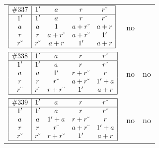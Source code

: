 \documentclass[12pt]{article}
\theoremstyle{definition}
\newcommand{\join}{\mathbin{+}}%
\newcommand{\con}[1]{#1\breve{\ }}
\newcommand{\id}{{1'}}%
\renewcommand{\top}{1}%
\begin{document}
\begin{center}
\begin{longtable}{l|c|c}
$
\begin{array}{|c|cccc|} \hline
\#337 & \id & a & r & \con{r} \\ \hline
\id & \id & a & r & \con{r} \\
a & a & \top & a \join \con{r} & a \join r \\
r & r & a \join \con{r} & a \join \con{r} & \id \\
\con{r} & \con{r} & a \join r & \id & a \join r \\ \hline
\end{array}
$
 & no  
 & \adjustbox{valign=c, max height=1.6cm}{$
\left[ \begin{array}{cccccc}
\id & a & r & \con{r} & a & a \\ 
a & \id & a & a & a & r \\ 
\con{r} & a & \id & r & a & a \\ 
r & a & \con{r} & \id & a & a \\ 
a & a & a & a & \id & \con{r} \\ 
a & \con{r} & a & a & r & \id
\end{array}\right]
$}
     \\[15mm]

$
\begin{array}{|c|cccc|} \hline
\#338 & \id & a & r & \con{r} \\ \hline
\id & \id & a & r & \con{r} \\
a & a & \id & r \join \con{r} & r \\
r & r & \con{r} & a \join \con{r} & \id \join a \\
\con{r} & \con{r} & r \join \con{r} & \id & a \join r \\ \hline
\end{array}
$
 & no  
 & no       \\[15mm]

$
\begin{array}{|c|cccc|} \hline
\#339 & \id & a & r & \con{r} \\ \hline
\id & \id & a & r & \con{r} \\
a & a & \id \join a & r \join \con{r} & r \\
r & r & \con{r} & a \join \con{r} & \id \join a \\
\con{r} & \con{r} & r \join \con{r} & \id & a \join r \\ \hline
\end{array}
$
 & no  
 & no       \\[15mm]


\end{longtable}
\end{center}
\end{document}
